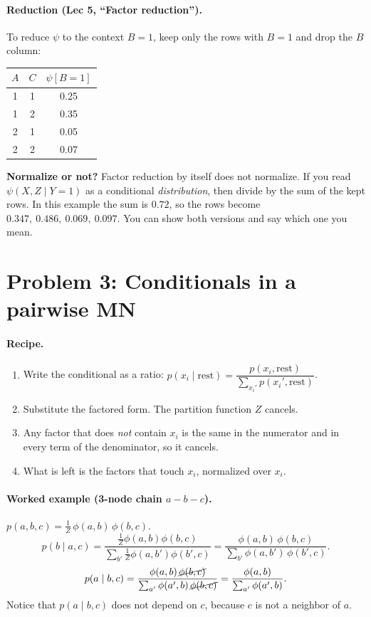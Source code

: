 \documentclass[11pt]{article}
\begin{document}
\paragraph{Reduction (Lec 5, ``Factor reduction'').} To reduce
$\psi$ to the context $B=1$, keep only the rows with $B=1$ and drop the $B$
column:
\begin{center}
\begin{tabular}{cc|c}
  \toprule $A$&$C$&$\psi[B=1]$\\ \midrule
  1&1&0.25\\ 1&2&0.35\\ 2&1&0.05\\ 2&2&0.07\\ \bottomrule
\end{tabular}
\end{center}
\textbf{Normalize or not?} Factor reduction by itself does not normalize.
If you read $\psi(X,Z\mid Y=1)$ as a conditional \emph{distribution}, then
divide by the sum of the kept rows. In this example the sum is $0.72$, so
the rows become $0.347,\ 0.486,\ 0.069,\ 0.097$. You can show both versions
and say which one you mean.

\section*{Problem 3: Conditionals in a pairwise MN}

\paragraph{Recipe.}
\begin{enumerate}
  \item Write the conditional as a ratio:
        $p(x_i \mid \text{rest}) = \dfrac{p(x_i,\text{rest})}{\sum_{x_i'} p(x_i',\text{rest})}$.
  \item Substitute the factored form. The partition function $Z$ cancels.
  \item Any factor that does \emph{not} contain $x_i$ is the same in the
        numerator and in every term of the denominator, so it cancels.
  \item What is left is the factors that touch $x_i$, normalized over $x_i$.
\end{enumerate}

\paragraph{Worked example (3-node chain $a - b - c$).}
$p(a,b,c) = \tfrac1Z\,\phi(a,b)\,\phi(b,c)$.
\[
  p(b \mid a, c)
  = \frac{\tfrac1Z\phi(a,b)\phi(b,c)}{\sum_{b'}\tfrac1Z\phi(a,b')\phi(b',c)}
  = \frac{\phi(a,b)\,\phi(b,c)}{\sum_{b'}\phi(a,b')\,\phi(b',c)} .
\]
\[
  p(a \mid b, c)
  = \frac{\phi(a,b)\,\cancel{\phi(b,c)}}{\sum_{a'}\phi(a',b)\,\cancel{\phi(b,c)}}
  = \frac{\phi(a,b)}{\sum_{a'}\phi(a',b)} .
\]
Notice that $p(a\mid b,c)$ does not depend on $c$, because $c$ is not a
neighbor of $a$.
\end{document}
